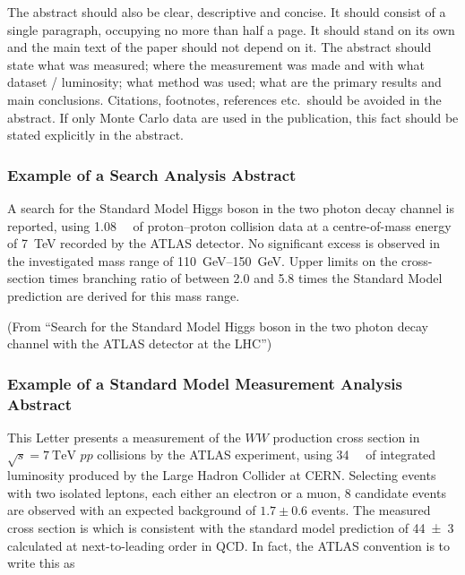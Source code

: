 \documentclass[PAPER,UKenglish,texlive=2016]{\ATLASLATEXPATH atlasdoc}
\begin{document}
The abstract should also be clear, descriptive and concise. 
It should consist of a single paragraph, occupying no more than half a page. 
It should stand on its own and the main text of the paper should not depend on it. 
The abstract should state what was measured; where the measurement was made and with what dataset / luminosity;
what method was used; 
what are the primary results and main conclusions. 
Citations, footnotes, references etc.\ should be avoided in the abstract. 
If only Monte Carlo data are used in the publication, this fact should be stated explicitly in the abstract.  


\subsubsection*{Example of a Search Analysis Abstract}

A search for the Standard Model Higgs boson in the two photon decay channel is reported, 
using \SI{1.08}{\per\fb} of proton--proton collision data at a centre-of-mass energy of \SI{7}{\TeV} recorded by the ATLAS detector.
No significant excess is observed in the investigated mass range of \SIrange{110}{150}{\GeV}. 
Upper limits on the cross-section times branching ratio of between 2.0 and 5.8 times the Standard Model prediction are derived for this mass range.

\noindent(From \enquote{Search for the Standard Model Higgs boson in the two photon decay channel with the ATLAS detector at the LHC})

\subsubsection*{Example of a Standard Model Measurement Analysis Abstract}

This Letter presents a measurement of the $WW$ production cross section in $\sqrt{s} = \SI{7}{\TeV}$ $pp$ collisions by the ATLAS experiment, using \SI{34}{\per\pb} of integrated luminosity produced by the Large Hadron Collider at CERN. Selecting events with two isolated leptons, each either an electron or a muon, 8 candidate events are observed with an expected background of $1.7 \pm 0.6$ events.
The measured cross section is 
which is consistent with the standard model prediction of \SI{44(3)}{\pb} calculated at next-to-leading order in QCD. 
In fact, the ATLAS convention is to write this as
\end{document}
